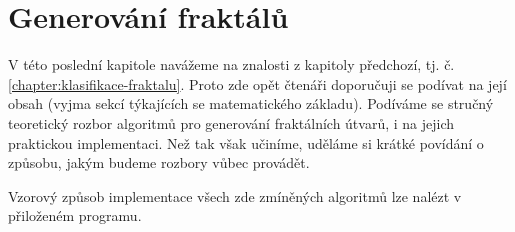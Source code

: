 \chapter{Generování fraktálů}\label{chapter:generovani-fraktalu}

V této poslední kapitole navážeme na znalosti z kapitoly předchozí, tj. č. \ref{chapter:klasifikace-fraktalu}. Proto zde opět čtenáři doporučuji se podívat na její obsah (vyjma sekcí týkajících se matematického základu). Podíváme se stručný teoretický rozbor algoritmů pro generování fraktálních útvarů, i na jejich praktickou implementaci. Než tak však učiníme, uděláme si krátké povídání o způsobu, jakým budeme rozbory vůbec provádět.

Vzorový způsob implementace všech zde zmíněných algoritmů lze nalézt v přiloženém programu.




